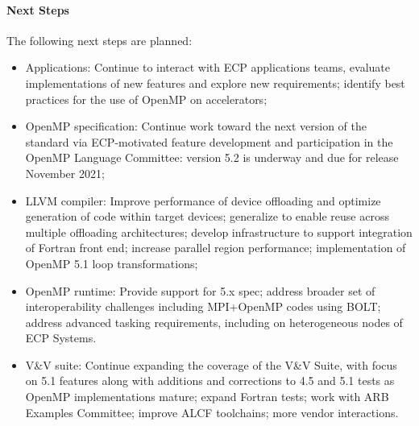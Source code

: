 
\paragraph{Next Steps}
The following next steps are planned:
\begin{itemize}
\item Applications: Continue to interact with ECP applications teams, evaluate implementations of new features and explore new requirements; identify best practices for the use of OpenMP on accelerators;

\item OpenMP specification: Continue work toward the next version of the standard via ECP-motivated feature development and participation in the OpenMP Language Committee: version 5.2 is underway and due for release November 2021;

\item LLVM compiler: Improve performance of device offloading and optimize generation of code within target devices; generalize to enable reuse across multiple offloading architectures; develop infrastructure to support integration of Fortran front end; increase parallel region performance; implementation of OpenMP 5.1 loop transformations;

\item OpenMP runtime: Provide support for 5.x spec; address broader set of interoperability challenges including MPI+OpenMP codes using BOLT; address advanced tasking requirements, including on heterogeneous nodes of ECP Systems.

\item V\&V suite: Continue expanding the coverage of the V\&V Suite, with focus on 5.1 features along with additions and corrections to 4.5 and 5.1 tests as OpenMP implementations mature; expand Fortran tests; work with ARB Examples Committee; improve ALCF toolchains; more vendor interactions.
\end{itemize} 

